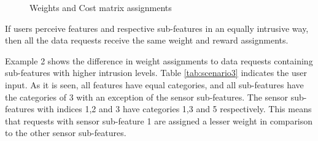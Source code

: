 \begin{figure}[htp]
  \hspace{1em}
  \caption{Weights and Cost matrix assignments}
  \label{fig:scenatio11}
\end{figure}

%

If users perceive features and respective sub-features in an equally intrusive way, then all the
data requests receive the same weight and reward assignments.

Example 2 shows the difference in weight assignments to data requests containing sub-features with higher intrusion levels.
Table \ref{tab:scenario3} indicates the user input. As it is seen, all features have equal categories, and
all sub-features have the categories of 3 with an exception of the sensor sub-features. The sensor sub-features with indices 1,2 and 3 have  categories 1,3 and 5 respectively. This means that requests with sensor sub-feature 1 are assigned a lesser weight in comparison to the other sensor sub-features. 

